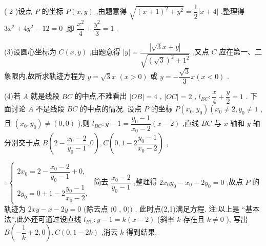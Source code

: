 ( 2 )设点 $P$ 的坐标 $P\left( {x,y}\right)$ ,由题意得 $\sqrt{{\left( x + 1\right) }^{2} + {y}^{2}} = \dfrac{1}{2}\left| {x + 4}\right|$ ,整理得 $3{x}^{2} + 4{y}^{2} - {12} = 0$ ,即 $\dfrac{{x}^{2}}{4} + \dfrac{{y}^{2}}{3} = 1$ .

(3)设圆心坐标为 $C\left( {x,y}\right)$ ,由题意得 $\left| y\right|  = \dfrac{\left| \sqrt{3}x + y\right| }{\sqrt{{\left( \sqrt{3}\right) }^{2} + {1}^{2}}}$ ,又点 $C$ 应在第一、二象限内,故所求轨迹方程为 $y = \sqrt{3}x$  $\left( {x > 0}\right)$ 或 $y =  - \dfrac{\sqrt{3}}{3}x\left( {x < 0}\right)$ .

(4)若 $A$ 就是线段 ${BC}$ 的中点,不难看出 $\left| {OB}\right|  = 4$ , $\left| {OC}\right|  = 2$ , ${l}_{BC} : \dfrac{x}{4} + \dfrac{y}{2} = 1$ . 下面讨论 $A$ 不是线段 ${BC}$ 的中点的情况. 设点 $P$ 的坐标 $P\left( {{x}_{0},{y}_{0}}\right) \left( {{x}_{0} \neq  2,{y}_{0} \neq  1}\right.$ ,且 $\left( {{x}_{0},{y}_{0}}\right)  \neq  \left( {0,0}\right)$ ),则 ${l}_{BC} : y - 1 = \dfrac{{y}_{0} - 1}{{x}_{0} - 2}\left( {x - 2}\right)$ ,直线 ${BC}$ 与 $x$ 轴和 $y$ 轴分别交于点 $B\left( {2 - \dfrac{{x}_{0} - 2}{{y}_{0} - 1},0}\right) ,C\left( {0,1 - 2\dfrac{{y}_{0} - 1}{{x}_{0} - 2}}\right)$ ,

$\therefore \left\{  \begin{array}{l} 2{x}_{0} = 2 - \dfrac{{x}_{0} - 2}{{y}_{0} - 1} + 0, \\  2{y}_{0} = 0 + 1 - 2\dfrac{{y}_{0} - 1}{{x}_{0} - 2}, \end{array}\right.$ 简去 $\dfrac{{x}_{0} - 2}{{y}_{0} - 1}$ ,整理得 $2{x}_{0}{y}_{0} - {x}_{0} - 2{y}_{0} = 0$ ,故点 $P$ 的轨迹为 ${2xy} - x - {2y} = 0$ (除去点 $(0$ , $0))$ . 此时点(2,1)满足方程. 注:以上是 “基本法”,此外还可通过设直线 ${l}_{BC} : y - 1 = k\left( {x - 2}\right)$ (斜率 $k$ 存在且 $k \neq  0$ ), 写出 $B\left( {-\dfrac{1}{k} + 2,0}\right) ,C\left( {0,1 - {2k}}\right)$ ,消去 $k$ 得到结果.

